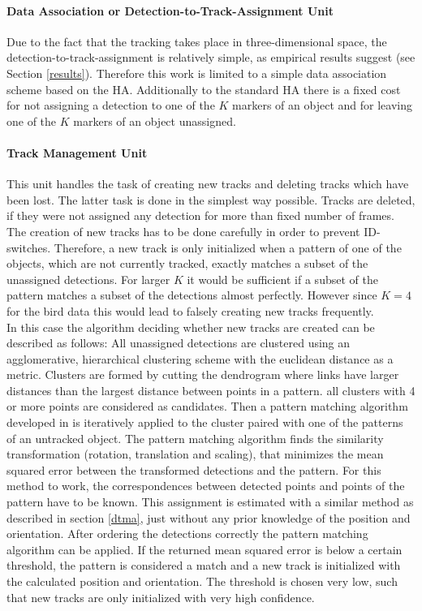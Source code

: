 \documentclass[12pt,a4paper]{article}
\begin{document}
\paragraph{Data Association or Detection-to-Track-Assignment Unit} 
Due to the fact that the tracking takes place in three-dimensional space, the detection-to-track-assignment is relatively simple, as  empirical results suggest (see Section \ref{results}). Therefore this work is limited to a simple data association scheme based on the HA. Additionally to the standard HA there is a fixed cost for not assigning a detection to one of the $K$ markers of an object and for leaving one of the $K$ markers of an object unassigned.


\paragraph{Track Management Unit} This unit handles the task of creating new tracks and deleting tracks which have been lost. The latter task is done in the simplest way possible. Tracks are deleted, if they were not assigned any detection for more than fixed number of frames.\\ 
The creation of new tracks has to be done carefully in order to prevent ID-switches. Therefore, a new track is only initialized when a pattern of one of the objects, which are not currently tracked, exactly matches a subset of the unassigned detections. For larger $K$ it would be sufficient if a subset of the pattern matches a subset of the detections almost perfectly. However since $K=4$ for the bird data this would lead to falsely creating new tracks frequently.\\
In this case the algorithm deciding whether new tracks are created can be described as follows: All unassigned detections are clustered using an agglomerative, hierarchical clustering scheme with the euclidean distance as a metric. Clusters are formed by cutting the dendrogram where links have larger distances than the largest distance between points in a pattern. all clusters with 4 or more points are considered as candidates. Then a pattern matching algorithm developed in \cite{umeyama} is iteratively applied to the cluster paired with one of the patterns of an untracked object. The pattern matching algorithm finds the similarity transformation (rotation, translation and scaling), that minimizes the mean squared error between the transformed detections and the pattern. For this method to work, the correspondences between detected points and points of the pattern have to be known. This assignment is estimated with a similar method as described in section \ref{dtma}, just without any prior knowledge of the position and orientation. After ordering the detections correctly the pattern matching algorithm can be applied. If the returned mean squared error is below a certain threshold, the pattern is considered a match and a new track is initialized with the calculated position and orientation. The threshold is chosen very low, such that new tracks are only initialized with very high confidence.
\end{document}

